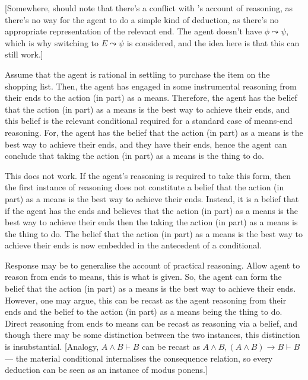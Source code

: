 \documentclass[10pt]{article}
\begin{document}
\newpage

[Somewhere, should note that there's a conflict with \citeauthor{Broome:2002aa}'s account of reasoning, as there's no way for the agent to do a simple kind of deduction, as there's no appropriate representation of the relevant end.
The agent doesn't have \(\phi \leadsto \psi\), which is why switching to \(E \leadsto \psi\) is considered, and the idea here is that this can still work.]

Assume that the agent is rational in settling to purchase the item on the shopping list.
Then, the agent has engaged in some instrumental reasoning from their ends to the action (in part) as a means.
Therefore, the agent has the belief that the action (in part) as a means is the best way to achieve their ends, and this belief is the relevant conditional required for a standard case of means-end reasoning.
For, the agent has the belief that the action (in part) as a means is the best way to achieve their ends, and they have their ends, hence the agent can conclude that taking the action (in part) as a means is the thing to do.

This does not work.
If the agent's reasoning is required to take this form, then the first instance of reasoning does not constitute a belief that the action (in part) as a means is the best way to achieve their ends.
Instead, it is a belief that if the agent has the ends and believes that the action (in part) as a means is the best way to achieve their ends then the taking the action (in part) as a means is the thing to do.
The belief that the action (in part) as a means is the best way to achieve their ends is now embedded in the antecedent of a conditional.

Response may be to generalise the account of practical reasoning.
Allow agent to reason from ends to means, this is what is given.
So, the agent can form the belief that the action (in part) as a means is the best way to achieve their ends.
However, one may argue, this can be recast as the agent reasoning from their ends and the belief to the action (in part) as a means being the thing to do.
Direct reasoning from ends to means can be recast as reasoning via a belief, and though there may be some distinction between the two instances, this distinction is insubstantial.
[Analogy, \(A \land B \vdash B\) can be recast as \(A \land B, (A \land B) \rightarrow B \vdash B\) --- the material conditional internalises the consequence relation, so every deduction can be seen as an instance of modus ponens.]
\end{document}
